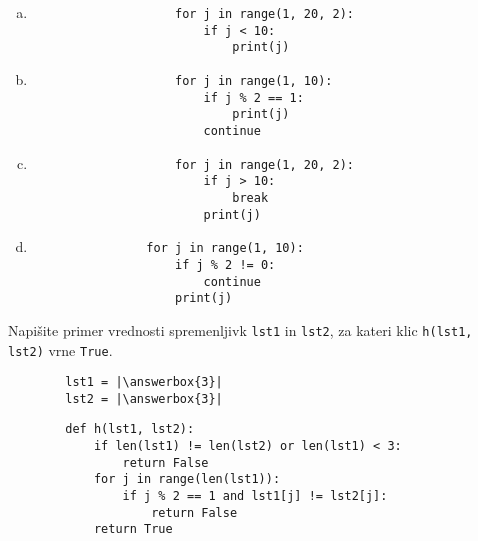 \documentclass[arhiv, 10pt]{../izpit}
\newcommand{\inlinepy}[1]{\texttt{#1}}
\newcommand{\answerbox}[1]{\framebox{\vphantom{\large M}\hspace{#1cm}}}
\begin{document}
        \begin{multicols}{2}
        \begin{enumerate}[(a)]
\item 
                \begin{verbatim}
                    for j in range(1, 20, 2):
                        if j < 10:
                            print(j)
                \end{verbatim}
            
\item 
                \begin{verbatim}
                    for j in range(1, 10):
                        if j % 2 == 1:
                            print(j)
                        continue
                \end{verbatim}
            
\item 
                \begin{verbatim}
                    for j in range(1, 20, 2):
                        if j > 10:
                            break
                        print(j)
                \end{verbatim}
            
\item 
            \begin{verbatim}
                for j in range(1, 10):
                    if j % 2 != 0:
                        continue
                    print(j)
            \end{verbatim}
        
\end{enumerate}

        \end{multicols}
    
        \naloga*
        \begin{multicols}{2}
        \noindent
        Napišite primer vrednosti spremenljivk \inlinepy{lst1} in \inlinepy{lst2}, za kateri klic \inlinepy{h(lst1, lst2)} vrne \inlinepy{True}.
        \begin{verbatim}
        lst1 = |\answerbox{3}|
        lst2 = |\answerbox{3}|
        \end{verbatim}
        \vfil
        \columnbreak
        \begin{verbatim}
        def h(lst1, lst2):
            if len(lst1) != len(lst2) or len(lst1) < 3:
                return False
            for j in range(len(lst1)):
                if j % 2 == 1 and lst1[j] != lst2[j]:
                    return False
            return True
        \end{verbatim}
        \end{multicols}
    
\end{document}
